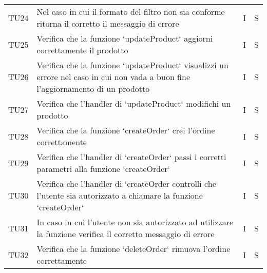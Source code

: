 \begin{center}
\begin{longtable}[!h]{p{45px} p{255px} p{35px} p{35px}}
        TU24          & Nel caso in cui il formato del filtro non sia conforme ritorna il corretto il messaggio di errore                                                                                                & I              & S              \\
        TU25          & Verifica che la funzione `updateProduct` aggiorni correttamente il prodotto                                                                                                                      & I              & S              \\
        TU26          & Verifica che la funzione `updateProduct` visualizzi un errore nel caso in cui non vada a buon fine l'aggiornamento di un prodotto                                                                & I              & S              \\
        TU27          & Verifica che l'handler di `updateProduct` modifichi un prodotto                                                                                                                                  & I              & S              \\
        TU28          & Verifica che la funzione `createOrder` crei l'ordine correttamente                                                                                                                               & I              & S              \\
        TU29          & Verifica che l'handler di `createOrder` passi i corretti parametri alla funzione `createOrder`                                                                                                   & I              & S              \\
        TU30          & Verifica che l'handler di `createOrder controlli che l'utente sia autorizzato a chiamare la funzione `createOrder`                                                                               & I              & S              \\
        TU31          & In caso in cui l'utente non sia autorizzato ad utilizzare la funzione verifica il corretto messaggio di errore                                                                                   & I              & S              \\
        TU32          & Verifica che la funzione `deleteOrder` rimuova l'ordine correttamente                                                                                                                            & I              & S              \\

\end{longtable}
\end{center}
